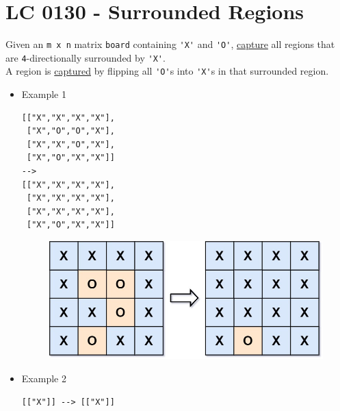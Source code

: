 \section{LC 0130 - Surrounded Regions}
Given an {\colorbox{CodeBackground}{\lstinline|m x n|}} matrix {\colorbox{CodeBackground}{\lstinline|board|}} containing {\colorbox{CodeBackground}{\lstinline|'X'|}} and {\colorbox{CodeBackground}{\lstinline|'O'|}}, \ul{capture} all regions that are {\colorbox{CodeBackground}{\lstinline|4|}}-directionally surrounded by {\colorbox{CodeBackground}{\lstinline|'X'|}}. \\

A region is \ul{captured} by flipping all {\colorbox{CodeBackground}{\lstinline|'O'|}}s into {\colorbox{CodeBackground}{\lstinline|'X'|}}s in that surrounded region.

\begin{itemize}
\item Example 1
\begin{lstlisting}
[["X","X","X","X"],
 ["X","O","O","X"],
 ["X","X","O","X"],
 ["X","O","X","X"]]
--> 
[["X","X","X","X"],
 ["X","X","X","X"],
 ["X","X","X","X"],
 ["X","O","X","X"]]

\end{lstlisting}
\begin{figure}[H]
\centering
\includegraphics[width=0.4\linewidth]{images/lc0130_eg}
\label{fig:lc0130eg}
\end{figure}
\item Example 2
\begin{lstlisting}
[["X"]] --> [["X"]]
\end{lstlisting}
\end{itemize}

